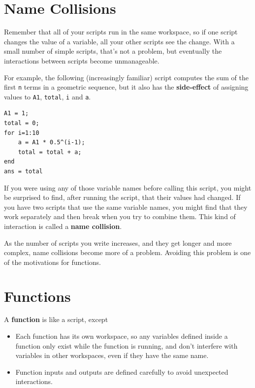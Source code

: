 \documentclass{book}
\begin{document}
\section{Name Collisions}

Remember that all of your scripts run in the same workspace, so
if one script changes the value of a variable, all your other
scripts see the change.  With a small number of simple scripts,
that's not a problem, but eventually the interactions between
scripts become unmanageable.

For example, the following (increasingly familiar) script computes the
sum of the first {\tt n} terms in a geometric sequence, but it also
has the {\bf side-effect} of assigning values to {\tt A1}, {\tt total},
{\tt i} and {\tt a}.

\begin{verbatim}
A1 = 1;
total = 0;
for i=1:10
    a = A1 * 0.5^(i-1);
    total = total + a;
end
ans = total
\end{verbatim}

If you were using any of those variable names before calling this
script, you might be surprised to find, after running the script,
that their values had changed.  If you have two scripts that use
the same variable names, you might find that they work separately
and then break when you try to combine them.  This kind of
interaction is called a {\bf name collision}.

As the number of scripts you write increases, and they get longer
and more complex, name collisions become more of a problem.  Avoiding
this problem is one of the motivations for functions.


\section{Functions}
\label{functions}

A {\bf function} is like a script, except

\begin{itemize}

\item Each function has its own workspace, so any variables defined
inside a function only exist while the function is running, and don't
interfere with variables in other workspaces, even if they have the
same name.

\item Function inputs and outputs are defined carefully to avoid
unexpected interactions.

\end{itemize}
\end{document}
